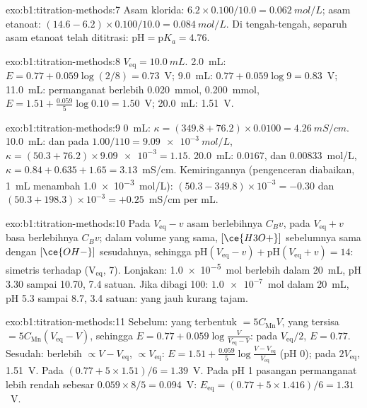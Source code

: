 \begin{solution}{exo:b1:titration-methods:7}
Asam klorida: $6.2 \times 0.100/10.0 = \qty{0.062}{mol/L}$; asam etanoat:
$(14.6 - 6.2) \times 0.100/10.0 = \qty{0.084}{mol/L}$. Di tengah-tengah,
separuh asam etanoat telah dititrasi: $\mathrm{pH} = \mathrm{p}K_a = 4.76$.
\end{solution}

\begin{solution}{exo:b1:titration-methods:8}
$V_{\mathrm{eq}} = \qty{10.0}{mL}$. 2.0~mL: $E = 0.77 + 0.059\log(2/8) =
0.73$~V; 9.0~mL: $0.77 + 0.059\log 9 = 0.83$~V; 11.0~mL: permanganat
berlebih \qty{0.020}{mmol},  \qty{0.200}{mmol}, $E = 1.51 +
\frac{0.059}{5}\log 0.10 = 1.50$~V; 20.0~mL: 1.51~V.
\end{solution}

\begin{solution}{exo:b1:titration-methods:9}
0~mL: $\kappa = (349.8 + 76.2) \times 0.0100 = \qty{4.26}{mS/cm}$.
10.0~mL:  dan  pada $1.00/110 = \qty{9.09e-3}{mol/L}$,
$\kappa = (50.3 + 76.2) \times \num{9.09e-3} = 1.15$. 20.0~mL: 
$0.0167$,  dan  $0.00833$~mol/L, $\kappa = 0.84 + 0.635 + 1.65
= 3.13$~mS/cm. Kemiringannya (pengenceran diabaikan, \qty{1}{mL}
menambah \qty{1.0e-3}{mol/L}): $(50.3 - 349.8) \times 10^{-3} = -0.30$ dan
$(50.3 + 198.3) \times 10^{-3} = +0.25$~mS/cm per mL.
\end{solution}

\begin{solution}{exo:b1:titration-methods:10}
Pada $V_{\mathrm{eq}} - v$ asam berlebihnya $C_Bv$, pada $V_{\mathrm{eq}} + v$
basa berlebihnya $C_Bv$; dalam volume yang sama, $[\ce{H3O+}]$ sebelumnya
sama dengan $[\ce{OH-}]$ sesudahnya, sehingga $\mathrm{pH}(V_{\mathrm{eq}} - v) +
\mathrm{pH}(V_{\mathrm{eq}} + v) = 14$: simetris terhadap (V$_{\mathrm{eq}}$,
7). Lonjakan: \qty{1.0e-5}{mol} berlebih dalam \qty{20}{mL}, pH 3.30
sampai 10.70, 7.4 satuan. Jika dibagi 100: $\num{1.0e-7}$~mol dalam
\qty{20}{mL}, pH 5.3 sampai 8.7, 3.4 satuan:  yang jauh kurang
tajam.
\end{solution}

\begin{solution}{exo:b1:titration-methods:11}
Sebelum:  yang terbentuk $= 5C_{\mathrm{Mn}}V$,  yang
tersisa $=
5C_{\mathrm{Mn}}(V_{\mathrm{eq}} - V)$, sehingga $E = 0.77 + 0.059\log\frac{V}{V_{\mathrm{eq}}
- V}$: pada $V_{\mathrm{eq}}/2$, $E = 0.77$. Sesudah:  berlebih $\propto
V - V_{\mathrm{eq}}$,  $\propto V_{\mathrm{eq}}$: $E = 1.51 +
\frac{0.059}{5}\log\frac{V - V_{\mathrm{eq}}}{V_{\mathrm{eq}}}$ (pH 0); pada
$2V_{\mathrm{eq}}$, 1.51~V. Pada  $(0.77 + 5 \times 1.51)/6 =
1.39$~V. Pada pH 1 pasangan permanganat lebih rendah sebesar $0.059 \times 8/5 =
0.094$~V: $E_{\mathrm{eq}} = (0.77 + 5 \times 1.416)/6 = 1.31$~V.
\end{solution}

